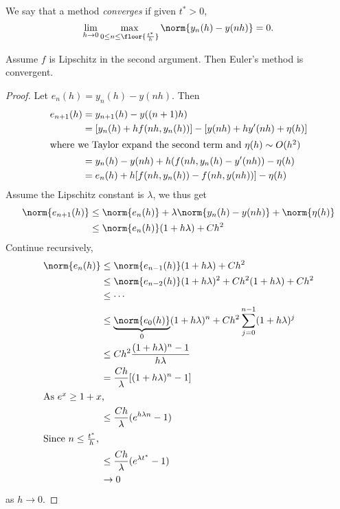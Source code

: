 \documentclass[a4paper]{article}
\begin{document}
\begin{definition}
  We say that a method \emph{converges} if given \(t^* > 0\),
  \[
    \lim_{h \to 0} \max_{0 \leq n \leq \floor{\frac{t^*}{h}}} \norm{y_n(h) - y(nh)} = 0.
  \]
\end{definition}

\begin{theorem}
  Assume \(f\) is Lipschitz in the second argument. Then Euler's method is convergent.
\end{theorem}

\begin{proof}
  Let \(e_n(h) = y_n(h) - y(nh)\). Then
  \begin{align*}
    e_{n + 1}(h)
    &= y_{n + 1}(h) - y((n + 1)h) \\
    &= [y_n(h) + h f(nh, y_n(h))] - [y(nh) + hy'(nh) + \eta(h)] \\
    \intertext{where we Taylor expand the second term and \(\eta(h) \sim O(h^2)\)}
    &= y_n(h) - y(nh) + h(f(nh, y_n(h) - y'(nh)) - \eta(h) \\
    &= e_n(h) + h[f(nh, y_n(h)) - f(nh, y(nh))] - \eta(h)
  \end{align*}
  Assume the Lipschitz constant is \(\lambda\), we thus get
  \begin{align*}
    \norm{e_{n + 1}(h)}
    &\leq \norm{e_n(h)} + \lambda \norm{y_n(h) - y(nh)} + \norm{\eta(h)} \\
    &\leq \norm{e_n(h)}(1 + h\lambda) + Ch^2
  \end{align*}
  Continue recursively,
  \begin{align*}
    \norm{e_n(h)}
    &\leq \norm{e_{n - 1}(h)}(1 + h\lambda) + Ch^2 \\
    &\leq \norm{e_{n - 2}(h)}(1 + h\lambda)^2 + Ch^2(1 + h\lambda) + Ch^2 \\
    &\leq \cdots \\
    &\leq \underbrace{\norm{e_0(h)}}_0 (1 + h\lambda)^n + Ch^2 \sum_{j = 0}^{n - 1} (1 + h\lambda)^j \\
    &\leq Ch^2 \frac{(1 + h\lambda)^n - 1}{h\lambda} \\
    &= \frac{Ch}{\lambda} [(1 + h\lambda)^n - 1] \\
    \intertext{As \(e^x \geq 1 + x\),}
    &\leq \frac{Ch}{\lambda} (e^{h\lambda n} - 1) \\
    \intertext{Since \(n \leq \frac{t^*}{h}\),}
    &\leq \frac{Ch}{\lambda}(e^{\lambda t^*} - 1) \\
    &\to 0
  \end{align*}
  as \(h \to 0\).
\end{proof}
\end{document}

